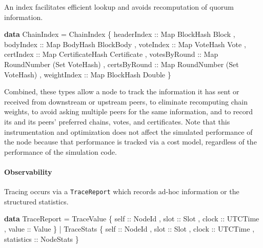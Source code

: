 \documentclass[10pt]{article}
\newenvironment{Shaded}{}{}
\newcommand{\DataTypeTok}[1]{\textcolor[rgb]{0.56,0.13,0.00}{#1}}
\newcommand{\KeywordTok}[1]{\textcolor[rgb]{0.00,0.44,0.13}{\textbf{#1}}}
\newcommand{\NormalTok}[1]{#1}
\newcommand{\OperatorTok}[1]{\textcolor[rgb]{0.40,0.40,0.40}{#1}}
\newcommand{\OtherTok}[1]{\textcolor[rgb]{0.00,0.44,0.13}{#1}}
\begin{document}
An index facilitates efficient lookup and avoids recomputation of quorum
information.

\begin{Shaded}
\begin{Highlighting}[]
\KeywordTok{data} \DataTypeTok{ChainIndex} \OtherTok{=} \DataTypeTok{ChainIndex}
\NormalTok{  \{}\OtherTok{ headerIndex ::} \DataTypeTok{Map} \DataTypeTok{BlockHash} \DataTypeTok{Block}
\NormalTok{  ,}\OtherTok{ bodyIndex ::} \DataTypeTok{Map} \DataTypeTok{BodyHash} \DataTypeTok{BlockBody}
\NormalTok{  ,}\OtherTok{ voteIndex ::} \DataTypeTok{Map} \DataTypeTok{VoteHash} \DataTypeTok{Vote}
\NormalTok{  ,}\OtherTok{ certIndex ::} \DataTypeTok{Map} \DataTypeTok{CertificateHash} \DataTypeTok{Certificate}
\NormalTok{  ,}\OtherTok{ votesByRound ::} \DataTypeTok{Map} \DataTypeTok{RoundNumber}\NormalTok{ (}\DataTypeTok{Set} \DataTypeTok{VoteHash}\NormalTok{)}
\NormalTok{  ,}\OtherTok{ certsByRound ::} \DataTypeTok{Map} \DataTypeTok{RoundNumber}\NormalTok{ (}\DataTypeTok{Set} \DataTypeTok{VoteHash}\NormalTok{)}
\NormalTok{  ,}\OtherTok{ weightIndex ::} \DataTypeTok{Map} \DataTypeTok{BlockHash} \DataTypeTok{Double}
\NormalTok{  \}}
\end{Highlighting}
\end{Shaded}

Combined, these types allow a node to track the information it has sent
or received from downstream or upstream peers, to eliminate recomputing
chain weights, to avoid asking multiple peers for the same information,
and to record its and its peers' preferred chains, votes, and
certificates. Note that this instrumentation and optimization does not
affect the simulated performance of the node because that performance is
tracked via a cost model, regardless of the performance of the
simulation code.

\paragraph{Observability}\label{observability}

Tracing occurs via a \texttt{TraceReport} which records ad-hoc
information or the structured statistics.

\begin{Shaded}
\begin{Highlighting}[]
\KeywordTok{data} \DataTypeTok{TraceReport}
  \OtherTok{=} \DataTypeTok{TraceValue}
\NormalTok{      \{}\OtherTok{ self ::} \DataTypeTok{NodeId}
\NormalTok{      ,}\OtherTok{ slot ::} \DataTypeTok{Slot}
\NormalTok{      ,}\OtherTok{ clock ::} \DataTypeTok{UTCTime}
\NormalTok{      ,}\OtherTok{ value ::} \DataTypeTok{Value}
\NormalTok{      \}}
  \OperatorTok{|} \DataTypeTok{TraceStats}
\NormalTok{      \{}\OtherTok{ self ::} \DataTypeTok{NodeId}
\NormalTok{      ,}\OtherTok{ slot ::} \DataTypeTok{Slot}
\NormalTok{      ,}\OtherTok{ clock ::} \DataTypeTok{UTCTime}
\NormalTok{      ,}\OtherTok{ statistics ::} \DataTypeTok{NodeStats}
\NormalTok{      \}}
\end{Highlighting}
\end{Shaded}
\end{document}

